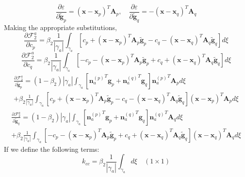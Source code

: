 \documentclass[11pt]{article} %
\begin{document}
\begin{equation}
	\frac{\partial \varepsilon}{\partial \tilde{\mathbf{g}}_p} = (\mathbf{x} - \mathbf{x}_p)^T \mathbf{A}_p, \quad \frac{\partial \varepsilon}{\partial \tilde{\mathbf{g}}_q} = -(\mathbf{x} - \mathbf{x}_q)^T \mathbf{A}_q
\end{equation}
Making the appropriate substitutions,
\begin{equation}
	\frac{\partial \mathcal{F}^a_2}{\partial c_p} = \beta_2 \frac{1}{| \gamma_a |} \int_{\gamma_a} \left[ c_p + (\mathbf{x} - \mathbf{x}_p)^T \mathbf{A}_p \tilde{\mathbf{g}}_p - c_q - (\mathbf{x} - \mathbf{x}_q)^T \mathbf{A}_q \tilde{\mathbf{g}}_q \right] d \xi
\end{equation}
\begin{equation}
	\frac{\partial \mathcal{F}^a_2}{\partial c_q} = \beta_2 \frac{1}{| \gamma_a |} \int_{\gamma_a} \left[ -c_p - (\mathbf{x} - \mathbf{x}_p)^T \mathbf{A}_p \tilde{\mathbf{g}}_p + c_q + (\mathbf{x} - \mathbf{x}_q)^T \mathbf{A}_q \tilde{\mathbf{g}}_q \right] d \xi
\end{equation}
\begin{eqnarray}
	\frac{\partial \mathcal{F}^a_2}{\partial \tilde{\mathbf{g}}_p} = (1-\beta_2) | \gamma_a | \int_{\gamma_a} \left[ {\mathbf{n}^{(p)}_a}^T \mathbf{g}_p + {\mathbf{n}^{(q)}_a}^T \mathbf{g}_q \right] {\mathbf{n}_a^{(p)}}^T \mathbf{A}_p d \xi \nonumber \\ + \beta_2 \frac{1}{| \gamma_a |} \int_{\gamma_a} \left[ c_p + (\mathbf{x} - \mathbf{x}_p)^T \mathbf{A}_p \tilde{\mathbf{g}}_p - c_q - (\mathbf{x} - \mathbf{x}_q)^T \mathbf{A}_q \tilde{\mathbf{g}}_q \right] (\mathbf{x} - \mathbf{x}_p)^T \mathbf{A}_p d \xi
\end{eqnarray}
\begin{eqnarray}
	\frac{\partial \mathcal{F}^a_2}{\partial \tilde{\mathbf{g}}_q} = (1-\beta_2) | \gamma_a | \int_{\gamma_a} \left[ {\mathbf{n}^{(p)}_a}^T \mathbf{g}_p + {\mathbf{n}^{(q)}_a}^T \mathbf{g}_q \right] {\mathbf{n}_a^{(q)}}^T \mathbf{A}_q d \xi \nonumber \\ + \beta_2 \frac{1}{| \gamma_a |} \int_{\gamma_a} \left[ -c_p - (\mathbf{x} - \mathbf{x}_p)^T \mathbf{A}_p \tilde{\mathbf{g}}_p + c_q + (\mathbf{x} - \mathbf{x}_q)^T \mathbf{A}_q \tilde{\mathbf{g}}_q \right] (\mathbf{x} - \mathbf{x}_q)^T \mathbf{A}_q d \xi
\end{eqnarray}
If we define the following terms:
\begin{equation}
	k_{cc} = \beta_2 \frac{1}{| \gamma_a |} \int_{\gamma_a} d \xi \quad (1 \times 1)
\end{equation}
\end{document}
